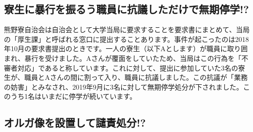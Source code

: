 \subsection{寮生に暴行を振るう職員に抗議しただけで無期停学!?}
熊野寮自治会は自治会として大学当局に要求することを要求書にまとめて、当局の「厚生課」と呼ばれる窓口に提出することあります。事件が起こったのは2018年10月の要求書提出のときです。一人の寮生（以下Aとします）が職員に取り囲まれ、暴行を受けました。Aさんが覆面をしていたため、当局はこの行為を「不審者対応」であると称しています。これに対して、提出に参加していた3名の寮生が、職員とAさんの間に割って入り、職員に抗議しました。この抗議が「業務の妨害」とみなされ、2019年9月に3名に対して無期停学処分が下されました。このうち1名はいまだに停学が続いています。


\newpage

\subsection{オルガ像を設置して譴責処分!?}

